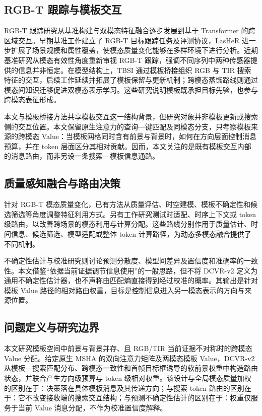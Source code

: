\documentclass[journal]{IEEEtran}
\begin{document}
\subsection{RGB-T 跟踪与模板交互}
RGB-T 跟踪研究从基准构建与双模态特征融合逐步发展到基于 Transformer 的跨区域交互。早期基准工作建立了 RGB-T 目标跟踪任务及评测协议，LasHeR 进一步扩展了场景规模和属性覆盖，使模态质量变化能够在多样环境下进行分析\cite{li2019benchmark,li2022lasher}。近期基准研究从模态有效性角度重新审视 RGB-T 跟踪，强调不同序列中两种传感器提供的信息并非恒定\cite{tang2025mvrgbt}。在模型结构上，TBSI 通过模板桥接组织 RGB 与 TIR 搜索特征的交互，后续工作延续并拓展了模板保留与更新机制\cite{hui2023tbsi,li2025tbsi}；跨模态蒸馏路线则通过模态间知识迁移促进双模态表示学习\cite{zhang2023crossdistill}。这些研究说明模板既承担目标先验，也参与跨模态表征形成。

本文与模板桥接方法共享模板交互这一结构背景，但研究对象并非模板更新或搜索侧的交互位置。本文保留原生注意力的查询—键匹配及同模态分支，只考察模板来源的跨模态 Value：当模板网格同时含有前景与背景时，如何在方向层面控制消息预算，并在 token 层面区分其相对贡献。因而，本文关注的是既有模板交互内部的消息路由，而非另设一条搜索—模板信息通路。

\subsection{质量感知融合与路由决策}
针对 RGB-T 模态质量变化，已有方法从质量评估、时空建模、模板不确定性和候选筛选等角度调整特征利用方式\cite{ding2025qstnet,ding2025tumnet,zhang2025btmtrack,tang2025mvrgbt}。另有工作研究测试时适配、时序上下文或 token 级路由，以改善跨场景的模态利用与计算分配\cite{shao2025pura,liu2026mosstrack,ding2026routing,guo2025dreamtrack,ni2026etmtrack}。这些路线分别作用于质量估计、时间信息、候选筛选、模型适配或整体 token 计算路径，为动态多模态融合提供了不同机制。

不确定性估计与校准研究则讨论预测分散度、模型间差异及置信度和准确率的一致性\cite{kendall2017uncertainties,lakshminarayanan2017deep,guo2017calibration}。本文借鉴“依据当前证据调节信息使用”的一般思路，但不将 DCVR-v2 定义为通用不确定性估计器，也不声称由匹配熵直接得到经过校准的概率。其输出是针对模板 Value 路径的相对路由权重，目标是控制信息进入另一模态表示的方向与来源位置。

\subsection{问题定义与研究边界}
本文研究模板空间中前景与背景并存、且 RGB/TIR 当前证据不对称时的跨模态 Value 分配。给定原生 MSHA 的双向注意力矩阵及两模态模板 Value，DCVR-v2 从模板—搜索匹配分布、跨模态一致性和首帧目标框诱导的软前景权重中构造路由状态，并联合产生方向级预算与 token 级相对权重。该设计与全局模态质量加权的区别在于：决策落在具体模板消息及其传递方向；与搜索 token 路由的区别在于：它不改变接收端的搜索交互结构；与预测不确定性估计的区别在于：权重仅服务于当前 Value 消息分配，不作为校准置信度解释。
\end{document}
